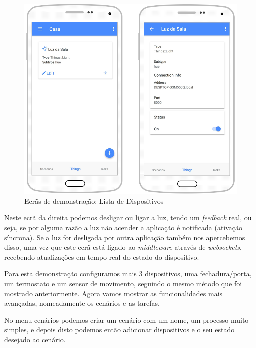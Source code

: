 \begin{figure}[H]
  \centering
        \includegraphics[scale=0.4]{img/demo/new_things_list_info.png}
  \caption{Ecrãs de demonstração: Lista de Dispositivos}
\end{figure}

Neste ecrã da direita podemos desligar ou ligar a luz, tendo um \textit{feedback} real, ou seja, se por alguma razão a luz não acender a aplicação é notificada (ativação síncrona). Se a luz for desligada por outra aplicação também nos apercebemos disso, uma vez que este ecrã está ligado ao \textit{middleware} através de \textit{websockets}, recebendo atualizações em tempo real do estado do dispositivo.

Para esta demonstração configuramos mais 3 dispositivos, uma fechadura/porta, um termostato e um sensor de movimento, seguindo o mesmo método que foi mostrado anteriormente. Agora vamos mostrar as funcionalidades mais avançadas, nomeadamente os cenários e as tarefas.

No menu cenários podemos criar um cenário com um nome, um processo muito simples, e depois disto podemos então adicionar dispositivos e o seu estado desejado ao cenário. 

